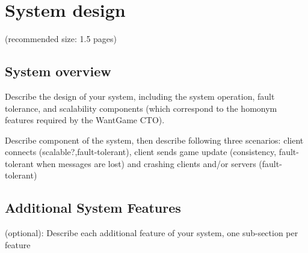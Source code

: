 \section{System design}
(recommended size: 1.5 pages)

\subsection{System overview}
Describe the design of your system, including the system
operation, fault tolerance, and scalability components (which correspond to the
homonym features required by the WantGame CTO).

Describe component of the system, then describe following three scenarios: client connects (scalable?,fault-tolerant), client sends game update (consistency, fault-tolerant when messages are lost) and crashing clients and/or servers (fault-tolerant)

\subsection{Additional System Features}
(optional): Describe each additional feature of your system, one sub-section per feature
 